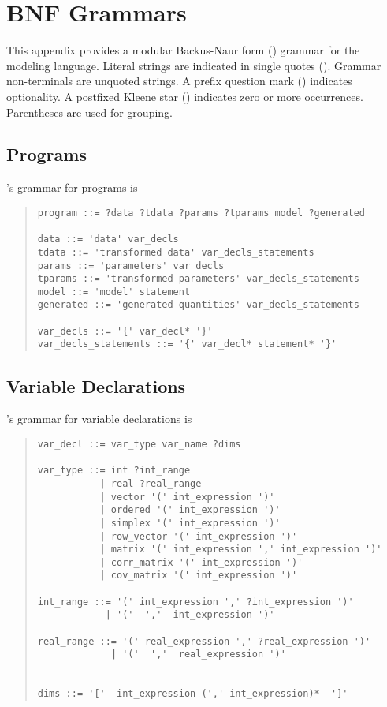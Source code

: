 \chapter{BNF Grammars}

This appendix provides a modular Backus-Naur form (\BNF) grammar for
the \Stan modeling language.  Literal strings are indicated in single
quotes ().  Grammar non-terminals are unquoted strings.  A
prefix question mark () indicates optionality.  A postfixed
Kleene star (\code{*}) indicates zero or more occurrences.
Parentheses are used for grouping.

\section{Programs}

\Stan's grammar for programs is
%
\begin{quote}
\begin{Verbatim}
program ::= ?data ?tdata ?params ?tparams model ?generated

data ::= 'data' var_decls
tdata ::= 'transformed data' var_decls_statements
params ::= 'parameters' var_decls
tparams ::= 'transformed parameters' var_decls_statements
model ::= 'model' statement
generated ::= 'generated quantities' var_decls_statements

var_decls ::= '{' var_decl* '}'
var_decls_statements ::= '{' var_decl* statement* '}'
\end{Verbatim}
\end{quote}

\section{Variable Declarations}

\Stan's grammar for variable declarations is
%
\begin{quote}
\begin{Verbatim}
var_decl ::= var_type var_name ?dims

var_type ::= int ?int_range
           | real ?real_range
           | vector '(' int_expression ')'
           | ordered '(' int_expression ')'
           | simplex '(' int_expression ')'
           | row_vector '(' int_expression ')'
           | matrix '(' int_expression ',' int_expression ')'
           | corr_matrix '(' int_expression ')'
           | cov_matrix '(' int_expression ')'

int_range ::= '(' int_expression ',' ?int_expression ')'
            | '('  ','  int_expression ')'

real_range ::= '(' real_expression ',' ?real_expression ')'
             | '('  ','  real_expression ')'


dims ::= '['  int_expression (',' int_expression)*  ']'
\end{Verbatim}
\end{quote}

